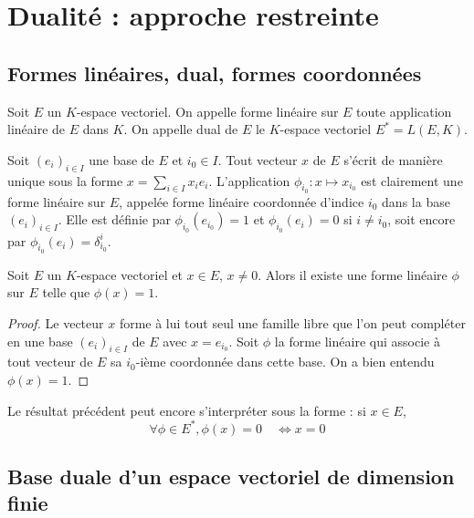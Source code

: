 \section{Dualité : approche restreinte}

\subsection{Formes linéaires, dual, formes coordonnées}

\begin{de}
Soit $E$ un $K$-espace vectoriel. On appelle forme linéaire sur $E$ toute application linéaire de $E$ dans $K$. On appelle dual de $E$ le $K$-espace vectoriel $E^*=L(E,K)$.
\end{de}

\begin{rem}
Soit $(e_i)_{i\in I}$ une base de $E$ et $i_0 \in I$. Tout vecteur $x$ de $E$ s'écrit de manière unique sous la forme $x = \sum_{i\in I} x_i e_i$. L'application $\phi_{i_0} : x \mapsto x_{i_0}$ est clairement une forme linéaire sur $E$, appelée forme linéaire coordonnée d'indice $i_0$ dans la base $(e_i)_{i\in I}$. Elle est définie par $\phi_{i_0}(e_{i_0}) = 1$ et $\phi_{i_0}(e_i) = 0$ si $i\neq i_0$, soit encore par $\phi_{i_0}(e_i) = \delta_{i_0}^i$.
\end{rem}

\begin{prop}
Soit $E$ un $K$-espace vectoriel et $x \in E$, $x\neq 0$. Alors il existe une forme linéaire $\phi$ sur $E$ telle que $\phi(x) = 1$.
\end{prop}

\begin{proof}
Le vecteur $x$ forme à lui tout seul une famille libre que l'on peut compléter en une base $(e_i)_{i\in I}$ de $E$ avec $x = e_{i_0}$. Soit $\phi$ la forme linéaire qui associe à tout vecteur de $E$ sa $i_0$-ième coordonnée dans cette base. On a bien entendu $\phi(x) = 1$.
\end{proof}

\begin{rem}
Le résultat précédent peut encore s'interpréter sous la forme : si $x \in E$,
\[ \forall \phi \in E^*, \phi(x) = 0 \quad \Leftrightarrow x = 0 \]
\end{rem}

\subsection{Base duale d'un espace vectoriel de dimension finie}

